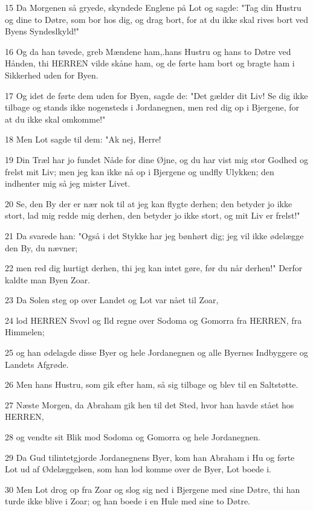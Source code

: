 \par 15 Da Morgenen så gryede, skyndede Englene på Lot og sagde: "Tag din Hustru og dine to Døtre, som bor hos dig, og drag bort, for at du ikke skal rives bort ved Byens Syndeslkyld!"
\par 16 Og da han tøvede, greb Mændene ham,.hans Hustru og hans to Døtre ved Hånden, thi HERREN vilde skåne ham, og de førte ham bort og bragte ham i Sikkerhed uden for Byen.
\par 17 Og idet de førte dem uden for Byen, sagde de: "Det gælder dit Liv! Se dig ikke tilbage og stands ikke nogensteds i Jordanegnen, men red dig op i Bjergene, for at du ikke skal omkomme!"
\par 18 Men Lot sagde til dem: "Ak nej, Herre!
\par 19 Din Træl har jo fundet Nåde for dine Øjne, og du har vist mig stor Godhed og frelst mit Liv; men jeg kan ikke nå op i Bjergene og undfly Ulykken; den indhenter mig så jeg mister Livet.
\par 20 Se, den By der er nær nok til at jeg kan flygte derhen; den betyder jo ikke stort, lad mig redde mig derhen, den betyder jo ikke stort, og mit Liv er frelst!"
\par 21 Da svarede han: "Også i det Stykke har jeg bønhørt dig; jeg vil ikke ødelægge den By, du nævner;
\par 22 men red dig hurtigt derhen, thi jeg kan intet gøre, før du når derhen!" Derfor kaldte man Byen Zoar.
\par 23 Da Solen steg op over Landet og Lot var nået til Zoar,
\par 24 lod HERREN Svovl og Ild regne over Sodoma og Gomorra fra HERREN, fra Himmelen;
\par 25 og han ødelagde disse Byer og hele Jordanegnen og alle Byernes Indbyggere og Landets Afgrøde.
\par 26 Men hans Hustru, som gik efter ham, så sig tilbage og blev til en Saltstøtte.
\par 27 Næste Morgen, da Abraham gik hen til det Sted, hvor han havde stået hos HERREN,
\par 28 og vendte sit Blik mod Sodoma og Gomorra og hele Jordanegnen.
\par 29 Da Gud tilintetgjorde Jordanegnens Byer, kom han Abraham i Hu og førte Lot ud af Ødelæggelsen, som han lod komme over de Byer, Lot boede i.
\par 30 Men Lot drog op fra Zoar og slog sig ned i Bjergene med sine Døtre, thi han turde ikke blive i Zoar; og han boede i en Hule med sine to Døtre.
